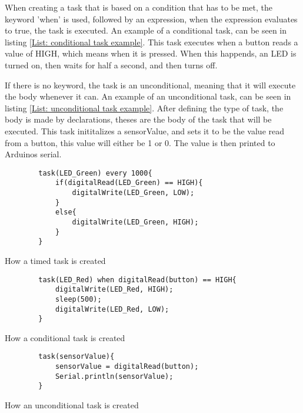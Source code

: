 When creating a task that is based on a condition that has to be met, the keyword 'when' is used, followed by an expression, when the expression evaluates to true, the task is executed. An example of a conditional task, can be seen in listing \ref*{List: conditional task example}. This task executes when a button reads a value of HIGH, which means when it is pressed. When this happends, an LED is turned on, then waits for half a second, and then turns off.

If there is no keyword, the task is an unconditional, meaning that it will execute the body whenever it can. An example of an unconditional task, can be seen in listing \ref*{List: unconditional task example}. After defining the type of task, the body is made by declarations, theses are the body of the task that will be executed. This task inititalizes a sensorValue, and sets it to be the value read from a button, this value will either be 1 or 0. The value is then printed to Arduinos serial.

\begin{listing}
    \begin{verbatim}
        task(LED_Green) every 1000{
            if(digitalRead(LED_Green) == HIGH){
                digitalWrite(LED_Green, LOW);
            }
            else{
                digitalWrite(LED_Green, HIGH);
            }
        }
    \end{verbatim}
    \caption{How a timed task is created}
    \label{List: Timed task example}
\end{listing}

\begin{listing}
    \begin{verbatim}
        task(LED_Red) when digitalRead(button) == HIGH{
            digitalWrite(LED_Red, HIGH);
            sleep(500);
            digitalWrite(LED_Red, LOW); 
        }
    \end{verbatim}
    \caption{How a conditional task is created}
    \label{List: conditional task example}
\end{listing}

\begin{listing}
    \begin{verbatim}
        task(sensorValue){
            sensorValue = digitalRead(button);
            Serial.println(sensorValue);
        }
    \end{verbatim}
    \caption{How an unconditional task is created}
    \label{List: unconditional task example}
\end{listing}


